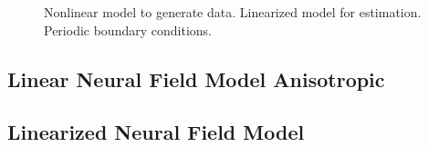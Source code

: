 \documentclass[conference]{IEEEtran}
\begin{document}
\begin{figure}[htbp]
	\centering
	\caption{Nonlinear model to generate data. Linearized model for estimation. Periodic boundary conditions.}
	\label{fig:label}
\end{figure}
\newpage
\subsection{Linear Neural Field Model Anisotropic}


\subsection{Linearized Neural Field Model}
\end{document}
